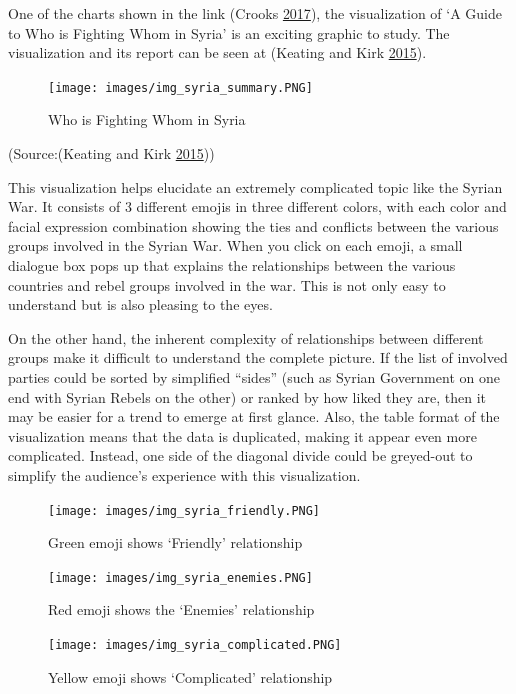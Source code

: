 \documentclass[]{book}
\begin{document}
One of the charts shown in the link (Crooks \protect\hyperlink{ref-int_viz_capt}{2017}), the visualization of `A Guide to Who is Fighting Whom in Syria' is an exciting graphic to study. The visualization and its report can be seen at (Keating and Kirk \protect\hyperlink{ref-syria_chart}{2015}).

\begin{figure}
\centering
\texttt{[image: images/img\_syria\_summary.PNG]}
\caption{Who is Fighting Whom in Syria}
\end{figure}

(Source:(Keating and Kirk \protect\hyperlink{ref-syria_chart}{2015}))

This visualization helps elucidate an extremely complicated topic like the Syrian War. It consists of 3 different emojis in three different colors, with each color and facial expression combination showing the ties and conflicts between the various groups involved in the Syrian War. When you click on each emoji, a small dialogue box pops up that explains the relationships between the various countries and rebel groups involved in the war. This is not only easy to understand but is also pleasing to the eyes.

On the other hand, the inherent complexity of relationships between different groups make it difficult to understand the complete picture. If the list of involved parties could be sorted by simplified ``sides'' (such as Syrian Government on one end with Syrian Rebels on the other) or ranked by how liked they are, then it may be easier for a trend to emerge at first glance. Also, the table format of the visualization means that the data is duplicated, making it appear even more complicated. Instead, one side of the diagonal divide could be greyed-out to simplify the audience's experience with this visualization.

\begin{figure}
\centering
\texttt{[image: images/img\_syria\_friendly.PNG]}
\caption{Green emoji shows `Friendly' relationship}
\end{figure}

\begin{figure}
\centering
\texttt{[image: images/img\_syria\_enemies.PNG]}
\caption{Red emoji shows the `Enemies' relationship}
\end{figure}

\begin{figure}
\centering
\texttt{[image: images/img\_syria\_complicated.PNG]}
\caption{Yellow emoji shows `Complicated' relationship}
\end{figure}
\end{document}
